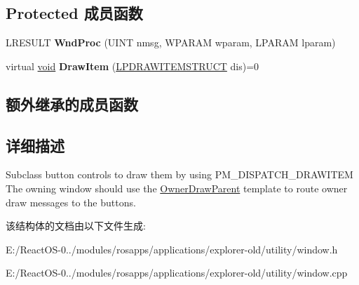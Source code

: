 \subsection*{Protected 成员函数}
\begin{DoxyCompactItemize}
\item 
\mbox{\label{struct_ownerdrawn_button_a2157333acfd6f271ae29c92687b0816b}} 
L\+R\+E\+S\+U\+LT {\bfseries Wnd\+Proc} (U\+I\+NT nmsg, W\+P\+A\+R\+AM wparam, L\+P\+A\+R\+AM lparam)
\item 
\mbox{\label{struct_ownerdrawn_button_adbc78f745e8e8d88dac0e531605c8145}} 
virtual \hyperlink{interfacevoid}{void} {\bfseries Draw\+Item} (\hyperlink{structtag_d_r_a_w_i_t_e_m_s_t_r_u_c_t}{L\+P\+D\+R\+A\+W\+I\+T\+E\+M\+S\+T\+R\+U\+CT} dis)=0
\end{DoxyCompactItemize}
\subsection*{额外继承的成员函数}


\subsection{详细描述}
Subclass button controls to draw them by using P\+M\+\_\+\+D\+I\+S\+P\+A\+T\+C\+H\+\_\+\+D\+R\+A\+W\+I\+T\+EM The owning window should use the \hyperlink{struct_owner_draw_parent}{Owner\+Draw\+Parent} template to route owner draw messages to the buttons. 

该结构体的文档由以下文件生成\+:\begin{DoxyCompactItemize}
\item 
E\+:/\+React\+O\+S-\/0../modules/rosapps/applications/explorer-\/old/utility/window.\+h\item 
E\+:/\+React\+O\+S-\/0../modules/rosapps/applications/explorer-\/old/utility/window.\+cpp\end{DoxyCompactItemize}
